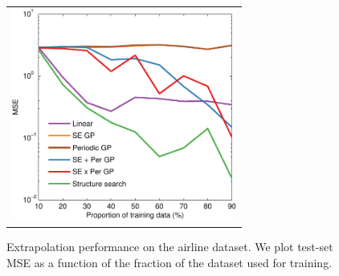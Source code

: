 \begin{figure}[h!]
\centering
\begin{tabular}{c}
\hspace{-0.5cm} \includegraphics[width=0.95\columnwidth,height=7cm]{../figures/extrapolation_curves/01-airline-s-ex-curve_hint.pdf}
\end{tabular}
\caption{Extrapolation performance on the airline dataset.  We plot test-set MSE as a function of the fraction of the dataset used for training. 
}
\label{fig:extrapolation}
\end{figure}
